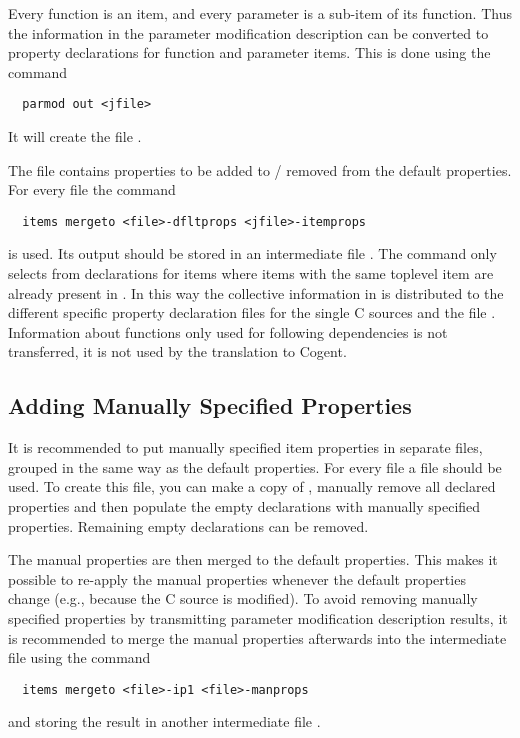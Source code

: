 Every function is an item, and every parameter is a sub-item of its function. Thus the information in the parameter modification
description can be converted to property declarations for function and parameter items. This is done using the command
\begin{verbatim}
  parmod out <jfile>
\end{verbatim}
It will create the file .

The file  contains properties to be added to / removed from the default properties. 
For every file  the command 
\begin{verbatim}
  items mergeto <file>-dfltprops <jfile>-itemprops
\end{verbatim}
is used. Its output should be stored in an intermediate file . The command only selects from 
 declarations for items where items with the same toplevel item are already present in
. In this way the collective information in  is distributed to the different
specific property declaration files for the single C sources and the file . Information about functions
only used for following dependencies is not transferred, it is not used by the translation to Cogent.

\subsection{Adding Manually Specified Properties}
\label{app-itemprops-manual}

It is recommended to put manually specified item properties in separate files, grouped in the same way as the default 
properties. For every file  a file  should be used. To create this file,
you can make a copy of , manually remove all declared properties and then populate the empty
declarations with manually specified properties. Remaining empty declarations can be removed.

The manual properties are then merged to the default properties. This makes it possible to re-apply the manual properties 
whenever the default properties change (e.g., because the C source is modified). To avoid removing manually specified 
properties by transmitting parameter modification description results, it is recommended to merge the manual properties 
afterwards into the intermediate file  using the command
\begin{verbatim}
  items mergeto <file>-ip1 <file>-manprops
\end{verbatim}
and storing the result in another intermediate file .

